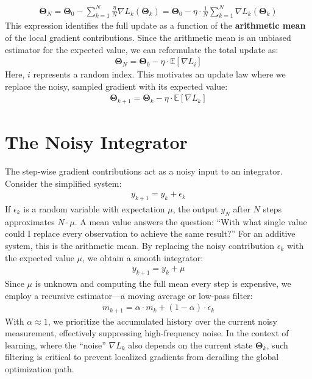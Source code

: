 \begin{align}
	\boldsymbol{\Theta}_{N} = \boldsymbol{\Theta}_{0} - \sum\limits_{k=1}^N \frac{\eta}{N} \nabla L_k(\boldsymbol{\Theta}_k) = \boldsymbol{\Theta}_{0} - \eta \cdot \frac{1}{N} \sum\limits_{k=1}^N \nabla L_k(\boldsymbol{\Theta}_k)
\end{align}
This expression identifies the full update as a function of the \textbf{arithmetic mean} of the local gradient contributions. Since the arithmetic mean is an unbiased estimator for the expected value, we can reformulate the total update as:
\begin{align}
	\boldsymbol{\Theta}_{N} = \boldsymbol{\Theta}_0 - \eta \cdot \mathbb{E}\left[ \nabla L_i \right]
\end{align}
Here, $i$ represents a random index. This motivates an update law where we replace the noisy, sampled gradient with its expected value:
\begin{align}
	\boldsymbol{\Theta}_{k+1} = \boldsymbol{\Theta}_k - \eta \cdot \mathbb{E}\left[ \nabla L_k \right]
\end{align}

\section{The Noisy Integrator}
The step-wise gradient contributions act as a noisy input to an integrator. Consider the simplified system:
\begin{align}
	y_{k+1} = y_k + \epsilon_k
\end{align}
If $\epsilon_k$ is a random variable with expectation $\mu$, the output $y_N$ after $N$ steps approximates $N \cdot \mu$. A mean value answers the question: \enquote{With what single value could I replace every observation to achieve the same result?} For an additive system, this is the arithmetic mean. By replacing the noisy contribution $\epsilon_k$ with the expected value $\mu$, we obtain a smooth integrator:
\begin{align}
	y_{k+1} = y_k + \mu
\end{align}
Since $\mu$ is unknown and computing the full mean every step is expensive, we employ a recursive estimator—a moving average or low-pass filter:
\begin{align}
	\label{eq:update}
	m_{k+1} = \alpha \cdot m_k + (1-\alpha) \cdot \epsilon_k
\end{align}
With $\alpha \approx 1$, we prioritize the accumulated history over the current noisy measurement, effectively suppressing high-frequency noise. In the context of learning, where the \enquote{noise} $\nabla L_k$ also depends on the current state $\boldsymbol{\Theta}_k$, such filtering is critical to prevent localized gradients from derailing the global optimization path.
